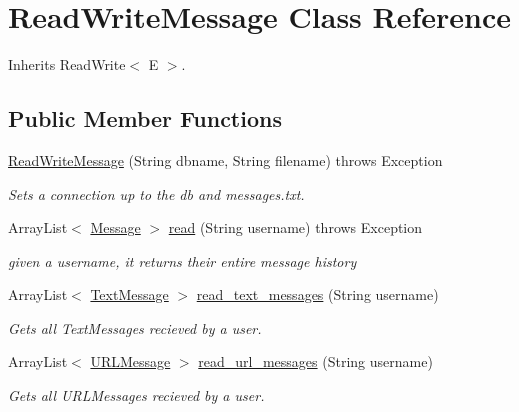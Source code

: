 \hypertarget{class_read_write_message}{}\section{Read\+Write\+Message Class Reference}
\label{class_read_write_message}


Inherits Read\+Write$<$ E $>$.

\subsection*{Public Member Functions}
\begin{DoxyCompactItemize}
\item 
\hyperlink{class_read_write_message_a91757d43631c332753ef62b61e48413e}{Read\+Write\+Message} (String dbname, String filename)  throws Exception     
\begin{DoxyCompactList}\small\item\em Sets a connection up to the db and messages.\+txt. \end{DoxyCompactList}\item 
Array\+List$<$ \hyperlink{class_message}{Message} $>$ \hyperlink{class_read_write_message_a134117f3846976650506f858cd049059}{read} (String username)  throws Exception     
\begin{DoxyCompactList}\small\item\em given a username, it returns their entire message history \end{DoxyCompactList}\item 
\mbox{\label{class_read_write_message_a28d03d35c19dfd67eb2b7ad7fd5ca414}} 
Array\+List$<$ \hyperlink{class_text_message}{Text\+Message} $>$ \hyperlink{class_read_write_message_a28d03d35c19dfd67eb2b7ad7fd5ca414}{read\+\_\+text\+\_\+messages} (String username)
\begin{DoxyCompactList}\small\item\em Gets all Text\+Messages recieved by a user. \end{DoxyCompactList}\item 
\mbox{\label{class_read_write_message_a851db30870febb26793696aea0be156b}} 
Array\+List$<$ \hyperlink{class_u_r_l_message}{U\+R\+L\+Message} $>$ \hyperlink{class_read_write_message_a851db30870febb26793696aea0be156b}{read\+\_\+url\+\_\+messages} (String username)
\begin{DoxyCompactList}\small\item\em Gets all U\+R\+L\+Messages recieved by a user. \end{DoxyCompactList}\item 

\end{DoxyCompactItemize}
